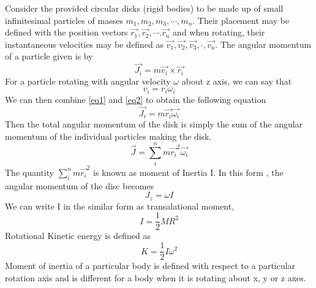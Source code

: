 Consider the provided circular disks (rigid bodies) to be made up of small infinitesimal particles of masses $m_1,m_2,m_3, \cdots,m_n$. Their placement may be defined with the position vectors $\vec{r_1},\vec{r_2},\cdots.\vec{r_n}$ and when rotating, their instantaneous velocities may be defined as
$\vec{v_1},\vec{v_2},\vec{v_3} ,\cdot,\vec{v_n}$.
The angular momentum of a particle given is by
\begin{equation}
    \label{eq1}
    \vec{J_i} = m \vec{v_i} \times \vec{r_i}
\end{equation}
For a particle rotating with angular velocity 
$ \omega$ about z axis, we can say that
\begin{equation}
    \label{eq2}
    v_i = r_i \omega_i
\end{equation}
We can then combine \ref{eq1} and \ref{eq2} to obtain the following equation
\begin{equation}
    \vec{J_i} = m\vec{r_i}\vec{\omega_i}
\end{equation}
Then the total angular momentum of the disk is simply the sum of the angular momentum of the individual particles making the disk.
\begin{equation}
    \vec{J} = \sum_i^n  m\vec{r_i}^2\vec{\omega_i}
\end{equation}
The quantity $\sum_i^n  m\vec{r_i}^2$ is known as moment of Inertia I. In this form , the angular momentum of the disc becomes
\begin{equation}
    J_z = \omega I
\end{equation}
We can write I in the similar form as transalational moment,
\begin{equation}
    I = \frac{1}{2} M R^2
\end{equation}
Rotational Kinetic energy is defined as 
\begin{equation}
    K = \frac{1}{2} I \omega ^2
\end{equation}
Moment of inertia of a particular body is defined with respect to a particular rotation axis and is different for a body when it is rotating about x, y or z axes.







